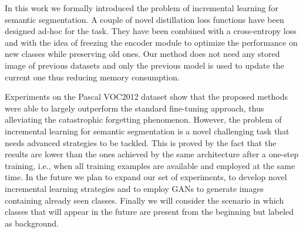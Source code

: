 \documentclass[10pt,twocolumn,letterpaper]{article}
\begin{document}
In this work we formally introduced the problem of incremental learning for semantic segmentation. A couple of novel distillation loss functions have been designed ad-hoc for the task. They have been combined with a cross-entropy loss and with the idea of freezing the encoder module to optimize the performance on new classes while preserving old ones.
Our method does not need any stored image of previous datasets and only the previous model is used to update the current one thus reducing memory consumption.

Experiments on the Pascal VOC2012 dataset show that the proposed methods were able to largely outperform the standard fine-tuning approach, thus alleviating the catastrophic forgetting phenomenon. However, the problem of incremental learning for semantic segmentation is a novel challenging task that needs advanced strategies to be tackled. This is proved by the fact that the results are lower than the ones achieved by the same architecture after a one-step training, i.e., when all training examples are available and employed at the same time.
In the future we plan to expand our set of experiments, to develop novel incremental learning strategies and to employ GANs to generate images containing already seen classes. Finally we will consider the scenario in which classes that will appear in the future are present from the beginning but labeled as background.

 
{\small


}
\end{document}
